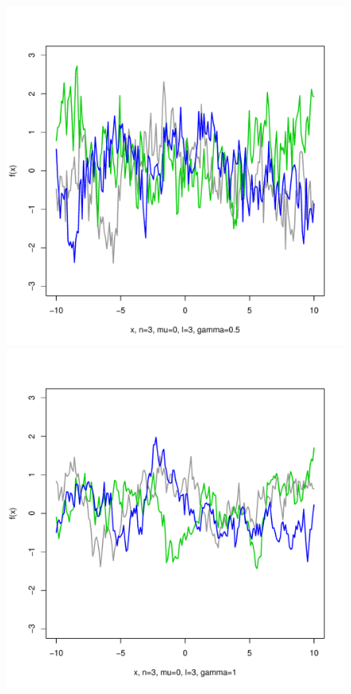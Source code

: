 \documentclass[12pt,letterpaper]{article}
\begin{document}
\begin{figure}
\begin{center}
\includegraphics[scale=0.2]{hw321/n3-m0-l3-g1.pdf}
\includegraphics[scale=0.2]{hw321/n3-m0-l3-g2.pdf}

\end{center}
\end{figure}
\end{document}
